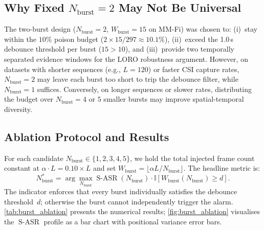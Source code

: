 \documentclass{article}
\newcommand{\SASR}{\operatorname{S-ASR}}
\newcommand{\Nb}{N_{\mathrm{burst}}}
\newcommand{\Wburst}{W_{\mathrm{burst}}}
\begin{document}
\subsection{Why Fixed $\Nb = 2$ May Not Be Universal}

The two-burst design ($\Nb = 2$, $\Wburst = 15$ on MM-Fi) was chosen to:
(i)~stay within the $10\%$ poison budget ($2 \times 15 / 297 \approx 10.1\%$),
(ii)~exceed the 1.0\,s debounce threshold per burst ($15 > 10$), and
(iii)~provide two temporally separated evidence windows for the LORO robustness argument.
However, on datasets with shorter sequences (e.g., $L = 120$) or faster CSI capture rates,
$\Nb = 2$ may leave each burst too short to trip the debounce filter, while $\Nb = 1$
suffices.  Conversely, on longer sequences or slower rates, distributing the budget over
$\Nb = 4$ or $5$ smaller bursts may improve spatial-temporal diversity.

\subsection{Ablation Protocol and Results}

For each candidate $\Nb \in \{1, 2, 3, 4, 5\}$, we hold the total injected frame count
constant at $\alpha \cdot L = 0.10 \times L$ and set
$\Wburst = \lfloor \alpha L / \Nb \rfloor$.  The headline metric is:
\begin{equation}
  \Nb^* = \arg\max_{\Nb} \SASR(\Nb) \cdot
          \mathbb{I}\!\left[\Wburst(\Nb) \ge d\right].
\end{equation}
The indicator enforces that every burst individually satisfies the debounce threshold~$d$;
otherwise the burst cannot independently trigger the alarm. \cref{tab:burst_ablation} presents
the numerical results; \cref{fig:burst_ablation} visualises the $\SASR$ profile as a bar chart
with positional variance error bars.
\end{document}
